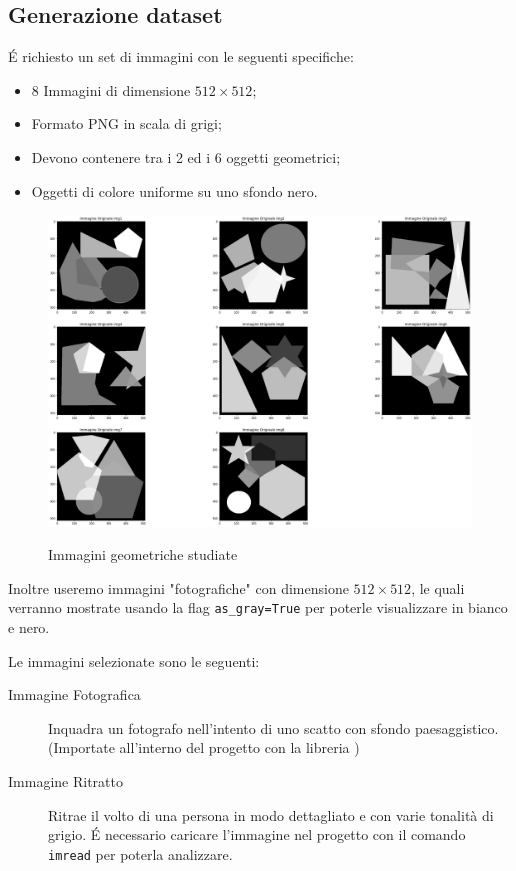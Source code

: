 {\color{bblue}\subsection{Generazione dataset}}
É richiesto un set di immagini con le seguenti specifiche: 
\begin{itemize}
    \item 8 Immagini di dimensione $512 \times 512$;
    \item Formato PNG in scala di grigi;
    \item Devono contenere tra i 2 ed i 6 oggetti geometrici;
    \item Oggetti di colore uniforme su uno sfondo nero.
\end{itemize}

\begin{figure}[H]
    \centering
    \includegraphics[width=0.5\linewidth]{./imgRel/dataset.png}\label{fig:datasetgeometriche}
    \caption{Immagini geometriche studiate}
\end{figure}

Inoltre useremo immagini "fotografiche" con dimensione $512 \times 512$, le quali verranno mostrate usando la flag 
\verb|as_gray=True| per 
poterle visualizzare in bianco e nero.

Le immagini selezionate sono le seguenti:
\begin{description}
    \item[Immagine Fotografica] Inquadra un fotografo nell'intento di uno scatto con sfondo 
    paesaggistico. (Importate all'interno del progetto con la libreria )
    \item[Immagine Ritratto] Ritrae il volto di una persona in modo dettagliato e con 
    varie tonalità di grigio. É necessario caricare l'immagine nel progetto con il comando \verb|imread| 
    per poterla analizzare.
\end{description}

